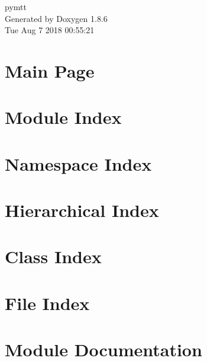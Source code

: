 \documentclass[twoside]{book}
\newcommand{\clearemptydoublepage}{%
  \newpage{\pagestyle{empty}\cleardoublepage}%
}
\begin{document}
\hypersetup{pageanchor=false}
\begin{titlepage}
\vspace*{7cm}
\begin{center}%
{\Large pymtt }\\
\vspace*{1cm}
{\large Generated by Doxygen 1.8.6}\\
\vspace*{0.5cm}
{\small Tue Aug 7 2018 00:55:21}\\
\end{center}
\end{titlepage}
\clearemptydoublepage
\tableofcontents
\clearemptydoublepage
{}
\hypersetup{pageanchor=true}

\chapter{Main Page}
\label{index}\hypertarget{index}{}
\chapter{Module Index}

\chapter{Namespace Index}

\chapter{Hierarchical Index}

\chapter{Class Index}

\chapter{File Index}

\chapter{Module Documentation}






















\end{document}
